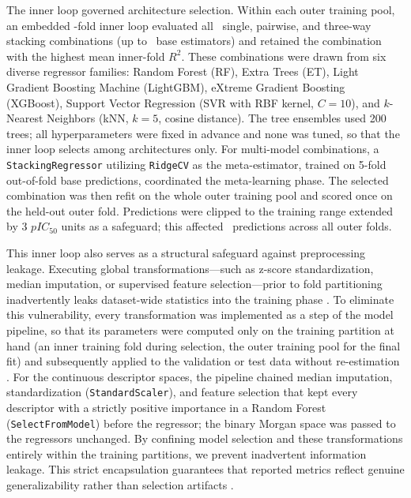 The inner loop governed architecture selection. Within each outer training pool, an embedded \InnerKFolds-fold inner loop evaluated all \NArchitectureCombos\ single, pairwise, and three-way stacking combinations (up to \MaxComboSize\ base estimators) and retained the combination with the highest mean inner-fold $R^2$. These combinations were drawn from six diverse regressor families: Random Forest (RF), Extra Trees (ET), Light Gradient Boosting Machine (LightGBM), eXtreme Gradient Boosting (XGBoost), Support Vector Regression (SVR with RBF kernel, $C=10$), and $k$-Nearest Neighbors (kNN, $k=5$, cosine distance). The tree ensembles used 200 trees; all hyperparameters were fixed in advance and none was tuned, so that the inner loop selects among architectures only. For multi-model combinations, a \texttt{StackingRegressor} utilizing \texttt{RidgeCV} as the meta-estimator, trained on 5-fold out-of-fold base predictions, coordinated the meta-learning phase. The selected combination was then refit on the whole outer training pool and scored once on the held-out outer fold. Predictions were clipped to the training range extended by 3 $pIC_{50}$ units as a safeguard; this affected \NClippedPredictions\ predictions across all outer folds.

This inner loop also serves as a structural safeguard against preprocessing leakage. Executing global transformations---such as z-score standardization, median imputation, or supervised feature selection---prior to fold partitioning inadvertently leaks dataset-wide statistics into the training phase \cite{cawley2010, varma2006}. To eliminate this vulnerability, every transformation was implemented as a step of the model pipeline, so that its parameters were computed only on the training partition at hand (an inner training fold during selection, the outer training pool for the final fit) and subsequently applied to the validation or test data without re-estimation \cite{brva2026}. For the continuous descriptor spaces, the pipeline chained median imputation, standardization (\texttt{StandardScaler}), and feature selection that kept every descriptor with a strictly positive importance in a Random Forest (\texttt{SelectFromModel}) before the regressor; the binary Morgan space was passed to the regressors unchanged. By confining model selection and these transformations entirely within the training partitions, we prevent inadvertent information leakage. This strict encapsulation guarantees that reported metrics reflect genuine generalizability rather than selection artifacts \cite{parvandeh2020, lewis2023, calle2025}.

